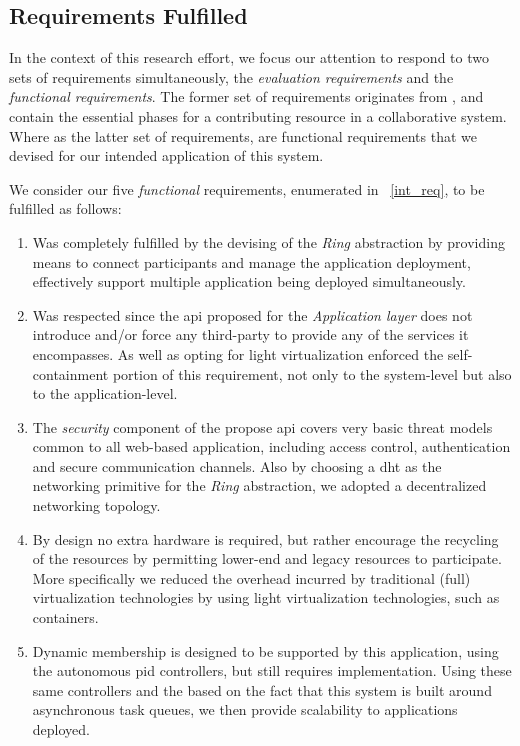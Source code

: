 \documentclass[12pt, titlepage]{uo_temp}
\begin{document}
     \subsection{Requirements Fulfilled} 
     In the context of this research effort, we focus our attention to respond to two sets
     of requirements simultaneously, the \emph{evaluation requirements} and the
     \emph{functional requirements}. The former set of requirements originates from
     \cite{p2pcollab}, and contain the essential phases for a contributing resource in a
     collaborative system. Where as the latter set of requirements, are functional
     requirements that we devised for our intended application of this system.

     We consider our five \emph{functional} requirements, enumerated in ~\ref{int_req}, to
     be fulfilled as follows:
     \begin{enumerate}[label={\bf Requirement \arabic*}, 
                       wide=\parindent,
                       leftmargin=\parindent, 
                       rightmargin=\parindent]
     \item Was completely fulfilled by the devising of the \emph{Ring} abstraction by
       providing means to connect participants and manage the application deployment,
       effectively support multiple application being deployed simultaneously.
     \item Was respected since the \gls{api} proposed for the \emph{Application layer}
       does not introduce and/or force any third-party to provide any of the services it
       encompasses. As well as opting for light virtualization enforced the
       self-containment portion of this requirement, not only to the system-level but also
       to the application-level.
     \item The \emph{security} component of the propose \gls{api} covers very basic threat
       models common to all web-based application, including access control,
       authentication and secure communication channels. Also by choosing a \gls{dht} as
       the networking primitive for the \emph{Ring} abstraction, we adopted a
       decentralized networking topology.
     \item By design no extra hardware is required, but rather encourage the recycling of
       the resources by permitting lower-end and legacy resources to participate. More
       specifically we reduced the overhead incurred by traditional (full) virtualization
       technologies by using light virtualization technologies, such as containers.
     \item Dynamic membership is designed to be supported by this application, using the autonomous
       \gls{pid} controllers, but still requires implementation. Using these same
       controllers and the based on the fact that this system is built around asynchronous
       task queues, we then provide scalability to applications deployed.
     \end{enumerate}
\end{document}
